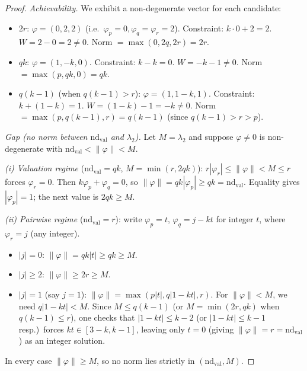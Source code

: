 \documentclass[12pt]{article}
\theoremstyle{definition}
\begin{document}
\begin{proof}
  \textit{Achievability.}  We exhibit a non-degenerate vector for each candidate:
  \begin{itemize}
    \item $2r$: $\varphi = (0, 2, 2)$ (i.e.\ $\varphi_p=0, \varphi_q=\varphi_r=2$).
      Constraint: $k\cdot 0 + 2 = 2$\checkmark.  $W = 2 - 0 = 2 \ne 0$.
      Norm $= \max(0, 2q, 2r) = 2r$.
    \item $qk$: $\varphi = (1, -k, 0)$.
      Constraint: $k - k = 0$\checkmark.  $W = -k-1 \ne 0$.
      Norm $= \max(p, qk, 0) = qk$.
    \item $q(k-1)$ (when $q(k-1) > r$): $\varphi = (1, 1-k, 1)$.
      Constraint: $k + (1-k) = 1$\checkmark.  $W = (1-k)-1 = -k \ne 0$.
      Norm $= \max(p, q(k-1), r) = q(k-1)$ (since $q(k-1) > r > p$).
  \end{itemize}

  \textit{Gap (no norm between $\mathrm{nd}_{\mathrm{val}}$ and $\lambda_2$).}
  Let $M = \lambda_2$ and suppose $\varphi \ne 0$ is non-degenerate with
  $\mathrm{nd}_{\mathrm{val}} < \|\varphi\| < M$.

  \textit{(i) Valuation regime} ($\mathrm{nd}_{\mathrm{val}}=qk$, $M=\min(r,2qk)$):
  $r|\varphi_r| \le \|\varphi\| < M \le r$ forces $\varphi_r = 0$.
  Then $k\varphi_p + \varphi_q = 0$, so $\|\varphi\| = qk|\varphi_p| \ge qk = \mathrm{nd}_{\mathrm{val}}$.
  Equality gives $|\varphi_p|=1$; the next value is $2qk \ge M$.

  \textit{(ii) Pairwise regime} ($\mathrm{nd}_{\mathrm{val}}=r$): write $\varphi_p = t$, $\varphi_q = j - kt$
  for integer $t$, where $\varphi_r = j$ (any integer).
  \begin{itemize}
    \item $|j| = 0$: $\|\varphi\| = qk|t| \ge qk \ge M$.
    \item $|j| \ge 2$: $\|\varphi\| \ge 2r \ge M$.
    \item $|j| = 1$ (say $j=1$): $\|\varphi\| = \max(p|t|, q|1-kt|, r)$.
      For $\|\varphi\| < M$, we need $q|1-kt| < M$.
      Since $M \le q(k-1)$ (or $M=\min(2r,qk)$ when $q(k-1)\le r$), one checks that
      $|1-kt| \le k-2$ (or $|1-kt| \le k-1$ resp.)\ forces $kt \in [3-k, k-1]$,
      leaving only $t = 0$ (giving $\|\varphi\|=r=\mathrm{nd}_{\mathrm{val}}$) as an integer solution.
  \end{itemize}
  In every case $\|\varphi\| \ge M$, so no norm lies strictly in $(\mathrm{nd}_{\mathrm{val}}, M)$.
\end{proof}
\end{document}
